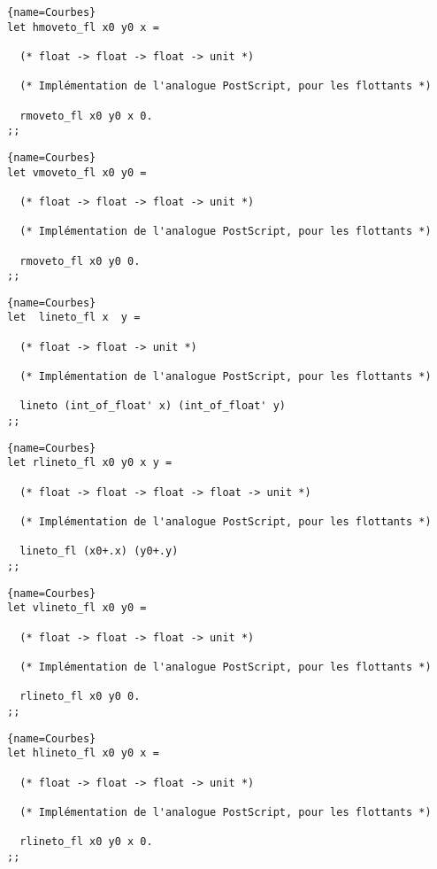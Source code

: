 \documentclass[10pt,twoside,a4paper]{article}
\begin{document}
\begin{lstlisting}{name=Courbes}
let hmoveto_fl x0 y0 x =

  (* float -> float -> float -> unit *)

  (* Implémentation de l'analogue PostScript, pour les flottants *)
  
  rmoveto_fl x0 y0 x 0.
;;
\end{lstlisting}

\begin{lstlisting}{name=Courbes}
let vmoveto_fl x0 y0 =

  (* float -> float -> float -> unit *)

  (* Implémentation de l'analogue PostScript, pour les flottants *)
  
  rmoveto_fl x0 y0 0.
;;
\end{lstlisting}

\begin{lstlisting}{name=Courbes}
let  lineto_fl x  y =

  (* float -> float -> unit *)

  (* Implémentation de l'analogue PostScript, pour les flottants *)
  
  lineto (int_of_float' x) (int_of_float' y)
;;
\end{lstlisting}

\begin{lstlisting}{name=Courbes}
let rlineto_fl x0 y0 x y =

  (* float -> float -> float -> float -> unit *)

  (* Implémentation de l'analogue PostScript, pour les flottants *)
  
  lineto_fl (x0+.x) (y0+.y)
;;
\end{lstlisting}

\begin{lstlisting}{name=Courbes}
let vlineto_fl x0 y0 =

  (* float -> float -> float -> unit *)

  (* Implémentation de l'analogue PostScript, pour les flottants *)
  
  rlineto_fl x0 y0 0.
;;
\end{lstlisting}

\begin{lstlisting}{name=Courbes}
let hlineto_fl x0 y0 x =

  (* float -> float -> float -> unit *)

  (* Implémentation de l'analogue PostScript, pour les flottants *)
  
  rlineto_fl x0 y0 x 0.
;;
\end{lstlisting}
\end{document}
